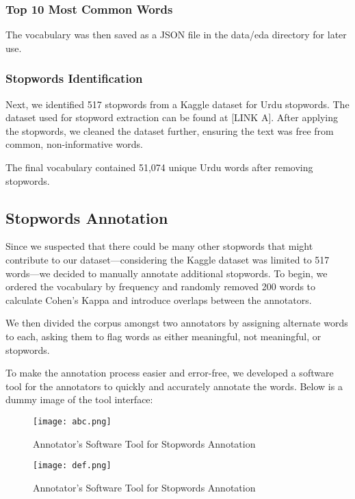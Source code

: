 \documentclass[sigconf]{acmart}
\begin{document}
\subsubsection{Top 10 Most Common Words}

The vocabulary was then saved as a JSON file in the data/eda directory for later use.

\subsubsection{Stopwords Identification}

Next, we identified 517 stopwords from a Kaggle dataset for Urdu stopwords. The dataset used for stopword extraction can be found at [LINK A]. After applying the stopwords, we cleaned the dataset further, ensuring the text was free from common, non-informative words.

The final vocabulary contained 51,074 unique Urdu words after removing stopwords.

\subsection{Stopwords Annotation}

Since we suspected that there could be many other stopwords that might contribute to our dataset—considering the Kaggle dataset was limited to 517 words—we decided to manually annotate additional stopwords. To begin, we ordered the vocabulary by frequency and randomly removed 200 words to calculate Cohen's Kappa and introduce overlaps between the annotators.

We then divided the corpus amongst two annotators by assigning alternate words to each, asking them to flag words as either meaningful, not meaningful, or stopwords.

To make the annotation process easier and error-free, we developed a software tool for the annotators to quickly and accurately annotate the words. Below is a dummy image of the tool interface:

\begin{figure}[h]
    \centering
    \texttt{[image: abc.png]} %
    \caption{Annotator's Software Tool for Stopwords Annotation}
    \label{fig:annotation_tool}
\end{figure}

\begin{figure}[h]
    \centering
    \texttt{[image: def.png]} %
    \caption{Annotator's Software Tool for Stopwords Annotation}
    \label{fig:annotation_tool}
\end{figure}
\end{document}
